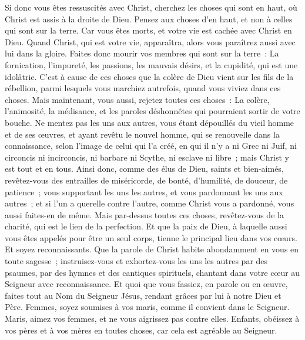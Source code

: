 \begin{multicols}{2}
\VerseOne{}Si donc vous êtes ressuscités avec Christ, cherchez les choses qui sont en haut, où Christ est assis à la droite de Dieu.
Pensez aux choses d'en haut, et non à celles qui sont sur la terre.
Car vous êtes morts, et votre vie est cachée avec Christ en Dieu.
Quand Christ, qui est votre vie, apparaîtra, alors vous paraîtrez aussi avec lui dans la gloire.
Faites donc mourir vos membres qui sont sur la terre~: La fornication, l'impureté, les passions, les mauvais désirs, et la cupidité, qui est une idolâtrie.
C'est à cause de ces choses que la colère de Dieu vient sur les fils de la rébellion,
parmi lesquels vous marchiez autrefois, quand vous viviez dans ces choses.
Mais maintenant, vous aussi, rejetez toutes ces choses~: La colère, l'animosité, la médisance, et les paroles déshonnêtes qui pourraient sortir de votre bouche.
Ne mentez pas les uns aux autres, vous étant dépouillés du vieil homme et de ses œuvres,
et ayant revêtu le nouvel homme, qui se renouvelle dans la connaissance, selon l'image de celui qui l'a créé,
en qui il n'y a ni Grec ni Juif, ni circoncis ni incirconcis, ni barbare ni Scythe, ni esclave ni libre~; mais Christ y est tout et en tous.
Ainsi donc, comme des élus de Dieu, saints et bien-aimés, revêtez-vous des entrailles de miséricorde, de bonté, d'humilité, de douceur, de patience~;
vous supportant les uns les autres, et vous pardonnant les uns aux autres~; et si l'un a querelle contre l'autre, comme Christ vous a pardonné, vous aussi faites-en de même.
Mais par-dessus toutes ces choses, revêtez-vous de la charité, qui est le lien de la perfection.
Et que la paix de Dieu, à laquelle aussi vous êtes appelés pour être un seul corps, tienne le principal lieu dans vos cœurs. Et soyez reconnaissants.
Que la parole de Christ habite abondamment en vous en toute sagesse~; instruisez-vous et exhortez-vous les uns les autres par des psaumes, par des hymnes et des cantiques spirituels, chantant dans votre cœur au Seigneur avec reconnaissance.
Et quoi que vous fassiez, en parole ou en œuvre, faites tout au Nom du Seigneur Jésus, rendant grâces par lui à notre Dieu et Père.
Femmes, soyez soumises à vos maris, comme il convient dans le Seigneur.
Maris, aimez vos femmes, et ne vous aigrissez pas contre elles.
Enfants, obéissez à vos pères et à vos mères en toutes choses, car cela est agréable au Seigneur.

\end{multicols}
